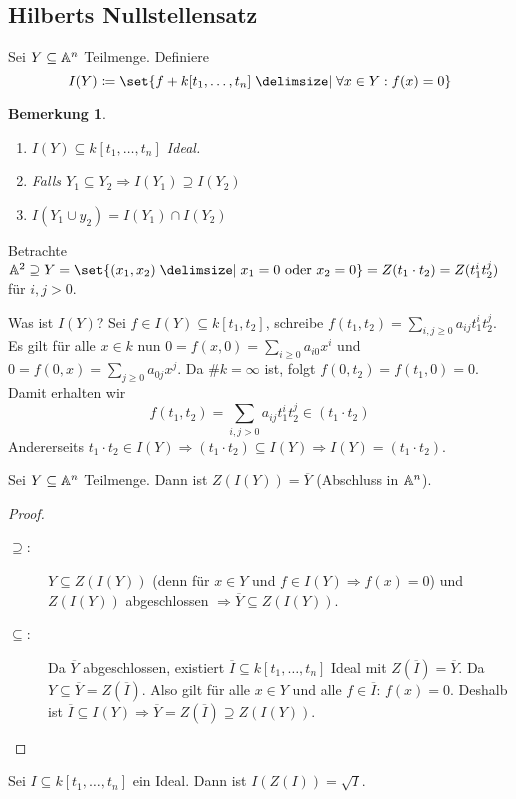 \documentclass[12pt,a4paper]{scrartcl}
\theoremstyle{cplain}
\theoremstyle{cdef}
\newtheorem{beme}[thmcounter]{Bemerkung}
\begin{document}
\subsection{Hilberts Nullstellensatz}
\begin{defi}
	Sei $Y\subseteq \mathbb A^n$ Teilmenge. Definiere
	$$I(Y)\coloneqq \set{f+k[t_1,\dots, t_n]\given \forall x\in Y: f(x) = 0}$$
\end{defi}
\begin{beme}
	\leavevmode
	\begin{enumerate} 
		\item $I(Y) \subseteq k[t_1,\dots, t_n]$ Ideal.
		\item Falls $Y_1\subseteq Y_2\Rightarrow I(Y_1)\supseteq I(Y_2)$
		\item $I(Y_1\cup y_2) = I(Y_1)\cap I(Y_2)$
	\end{enumerate}
\end{beme}
\begin{bsp}
	Betrachte $\IA^2 \supseteq Y = \set {(x_1,x_2)\given x_1 = 0\text{ oder } x_2 = 0} = Z(t_1\cdot t_2) = Z(t_1^it_2^j)$ für $i,j>0$.
	
	Was ist $I(Y)$? Sei $f\in I(Y)\subseteq k[t_1,t_2]$, schreibe $f(t_1,t_2) = \sum_{i,j\geq 0}a_{ij}t_1^it_2^j$. Es gilt für alle $x\in k$ nun $0 = f(x,0) = \sum_{i\geq0}a_{i0}x^i$ und $0 = f(0,x) = \sum_{j\geq 0} a_{0j}x^j$. Da $\#k = \infty $ ist, folgt $f(0,t_2) = f(t_1,0) = 0$. Damit erhalten wir
	$$f(t_1,t_2) = \sum_{i,j>0}a_{ij}t_1^it_2^j\in (t_1\cdot t_2)$$
	Andererseits $t_1\cdot t_2\in I(Y) \Rightarrow (t_1\cdot t_2)\subseteq I(Y)\Rightarrow I(Y) = (t_1\cdot t_2)$.
\end{bsp}
\begin{lem}
	Sei $Y\subseteq \mathbb A^n$ Teilmenge. Dann ist $Z(I(Y)) = \overline{Y}$ (Abschluss in $\mathbb A^n$).
\end{lem}
\begin{proof}
	\leavevmode
	\begin{description}
		\item[\glqq$\supseteq$\grqq:] $Y\subseteq Z(I(Y))$ (denn für $x\in Y$ und $f\in I(Y)\Rightarrow f(x) = 0$) und $Z(I(Y))$ abgeschlossen $\Rightarrow \overline{Y}\subseteq Z(I(Y))$.
		\item[\glqq$\subseteq$\grqq:] Da $\overline{Y}$ abgeschlossen, existiert $\overline{I}\subseteq k[t_1,\dots, t_n]$ Ideal mit $Z(\overline{I}) = \overline{Y}$. Da $Y\subseteq \overline{Y} = Z(\overline{I})$. Also gilt für alle $x\in Y$ und alle $f\in\overline{I}$: $f(x) = 0$. Deshalb ist $\overline{I}\subseteq I(Y)\Rightarrow \overline{Y} = Z(\overline{I}) \supseteq Z(I(Y))$.
	\end{description}
\end{proof}
\begin{satz}
	Sei $I\subseteq k[t_1,\dots, t_n]$ ein Ideal. Dann ist $I(Z(I)) = \sqrt{I}$. 
\end{satz}
\end{document}
